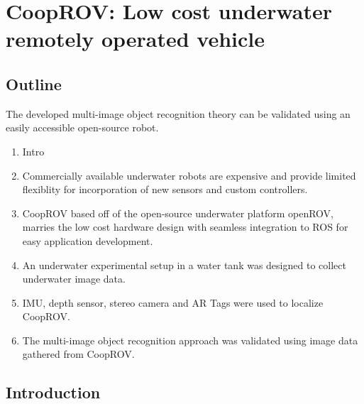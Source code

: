 \documentclass {udthesis}
\begin{document}

\chapter{CoopROV: Low cost underwater remotely operated vehicle}


\section{Outline}

The developed multi-image object recognition theory can be validated using an easily accessible 
open-source robot.

\begin{enumerate}[label=Section \arabic*:, start=0]
\item Intro

\item Commercially available underwater robots are expensive and provide limited flexiblity for incorporation of new sensors and custom controllers.

\item CoopROV based off of the open-source underwater platform openROV, marries the low cost hardware design with seamless integration to ROS for easy application development.

\item An underwater experimental setup in a water tank was designed to collect underwater image data.

\item IMU, depth sensor, stereo camera and AR Tags were used to localize CoopROV.

\item The multi-image object recognition approach was validated using image data gathered from CoopROV.

\end{enumerate}


\section{Introduction}
\end{document}
